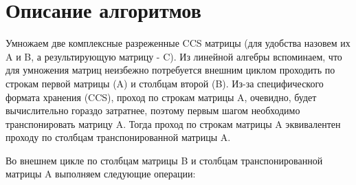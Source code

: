 \documentclass{report}
\begin{document}
	\section*{Описание алгоритмов}
		\par Умножаем две комплексные разреженные CCS матрицы (для удобства назовем их A и B, а результирующую матрицу - C). Из линейной алгебры вспоминаем, что для умножения матриц неизбежно потребуется внешним циклом проходить по строкам первой матрицы (A) и столбцам второй (B). Из-за специфического формата хранения (CCS), проход по строкам матрицы A, очевидно, будет вычислительно гораздо затратнее, поэтому первым шагом необходимо транспонировать матрицу A. Тогда проход по строкам матрицы A эквивалентен проходу по столбцам транспонированной матрицы A.
		\par Во внешнем цикле по столбцам матрицы B и столбцам транспонированной матрицы A выполняем следующие операции:
\end{document}
